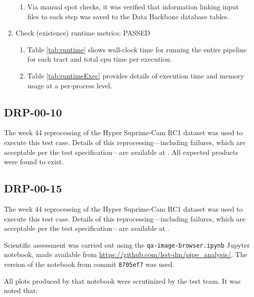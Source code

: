 \documentclass[DM,lsstdraft,STR,toc]{lsstdoc}
\begin{document}
\begin{enumerate}
{\begin{enumerate}
      \item{Via manual spot checks, it was verified that information linking input files to each step was saved to the Data Backbone database tables.}
    \end{enumerate}
  }

  \item{Check (existence) runtime metrics: PASSED

    \begin{enumerate}
      \item{Table \ref{tab:runtime} shows wall-clock time for running the entire pipeline for each tract and total cpu time per execution.}
      \item{Table \ref{tab:runtimeExec} provides details of execution time and memory usage at a per-process level.}
    \end{enumerate}
  }
\end{enumerate}

\subsection{DRP-00-10}
\label{sect:detail-drp-00-10}

The week 44 reprocessing of the Hyper Suprime-Cam RC1 dataset was used to execute this test case.
Details of this reprocessing---including failures, which are acceptable per the test specification---are available at .
All expected products were found to exist.

\subsection{DRP-00-15}
\label{sect:detail-drp-00-15}

The week 44 reprocessing of the Hyper Suprime-Cam RC1 dataset was used to execute this test case.
Details of this reprocessing---including failures, which are acceptable per the test specification---are available at .

Scientific assessment was carried out using the \texttt{qa-image-browser.ipynb} Jupyter notebook, made available from \url{https://github.com/lsst-dm/pipe_analysis/}.
The version of the notebook from commit \texttt{8705ef7} was used.

All plots produced by that notebook were scrutinized by the test team.
It was noted that:
\end{document}
